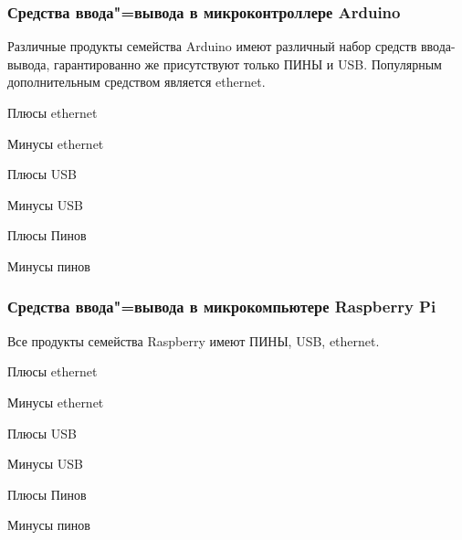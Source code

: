 \subsubsection{Средства ввода"=вывода в микроконтроллере Arduino}
Различные продукты семейства Arduino имеют различный набор средств ввода-вывода, гарантированно же присутствуют только ПИНЫ и USB. Популярным дополнительным средством является ethernet.

Плюсы ethernet

Минусы ethernet

Плюсы USB

Минусы USB

Плюсы Пинов

Минусы пинов

\subsubsection{Средства ввода"=вывода в микрокомпьютере Raspberry Pi}
Все продукты семейства Raspberry имеют ПИНЫ, USB, ethernet.

Плюсы ethernet

Минусы ethernet

Плюсы USB

Минусы USB

Плюсы Пинов

Минусы пинов